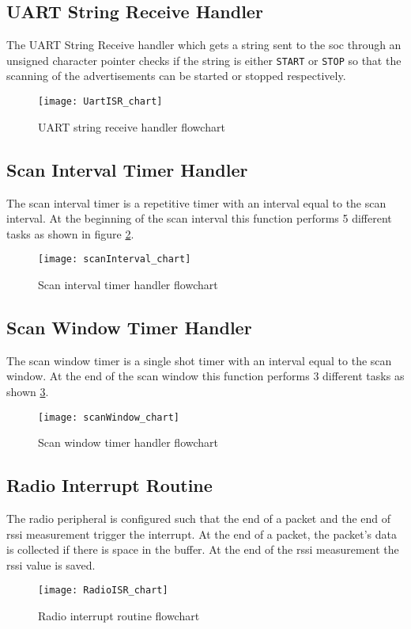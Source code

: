 \subsection{UART String Receive Handler}
The UART String Receive handler which gets a string sent to the \gls{soc} through an unsigned character pointer checks if the string is either \texttt{START} or \texttt{STOP} so that the scanning of the advertisements can be started or stopped respectively.
\begin{figure}[h]
\centering
\vspace{50pt}
\texttt{[image: UartISR\_chart]}
\caption{UART string receive handler flowchart}
\vspace{51pt}
\label{fig:UartISR_chart}
\end{figure}
\clearpage

\subsection{Scan Interval Timer Handler}
The scan interval timer is a repetitive timer with an interval equal to the scan interval. At the beginning of the scan interval this function performs 5 different tasks as shown in figure \ref{fig:scanInterval_chart}.
\begin{figure}[h]
\centering
\vspace{20pt}
\texttt{[image: scanInterval\_chart]}
\caption{Scan interval timer handler flowchart}
\label{fig:scanInterval_chart}
\end{figure}

\subsection{Scan Window Timer Handler}
The scan window timer is a single shot timer with an interval equal to the scan window. At the end of the scan window this function performs 3 different tasks as shown \ref{fig:scanWindow_chart}.
\begin{figure}[h]
\centering
\vspace{20pt}
\texttt{[image: scanWindow\_chart]}
\caption{Scan window timer handler flowchart}
\label{fig:scanWindow_chart}
\end{figure}

\subsection{Radio Interrupt Routine}
The radio peripheral is configured such that the end of a packet and the end of \acrshort{rssi} measurement trigger the interrupt. At the end of a packet, the packet's data is collected if there is space in the buffer. At the end of the \acrshort{rssi} measurement the \acrshort{rssi} value is saved.
\begin{figure}[h]
\centering
\vspace{10pt}
\texttt{[image: RadioISR\_chart]}
\caption{Radio interrupt routine flowchart}
\label{fig:RadioISR_chart}
\end{figure}

